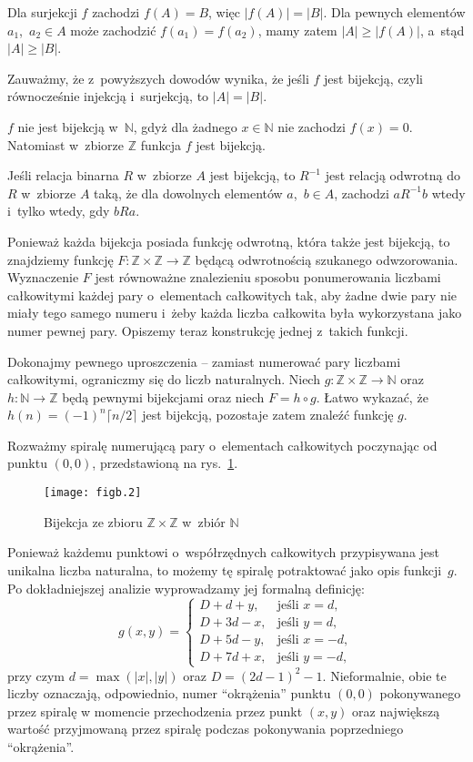\subexercise
Dla surjekcji $f$ zachodzi $f(A)=B$, więc $|f(A)|=|B|$. Dla pewnych elementów $a_1$,~$a_2\in A$ może zachodzić $f(a_1)=f(a_2)$, mamy zatem $|A|\ge|f(A)|$, a~stąd $|A|\ge|B|$.
\bigskip

Zauważmy, że z~powyższych dowodów wynika, że jeśli $f$ jest bijekcją, czyli równocześnie injekcją i~surjekcją, to $|A|=|B|$.

\exercise %
$f$ nie jest bijekcją w~$\mathbb{N}$, gdyż dla żadnego $x\in\mathbb{N}$ nie zachodzi $f(x)=0$. Natomiast w~zbiorze $\mathbb{Z}$ funkcja $f$ jest bijekcją.

\exercise %
Jeśli relacja binarna $R$ w~zbiorze $A$ jest bijekcją, to $R^{-1}$ jest relacją odwrotną do $R$ w~zbiorze $A$ taką, że dla dowolnych elementów $a$,~$b\in A$, zachodzi $aR^{-1}b$ wtedy i~tylko wtedy, gdy $bRa$.

\exercise %
Ponieważ każda bijekcja posiada funkcję odwrotną, która także jest bijekcją, to znajdziemy funkcję $F\colon\mathbb{Z}\times\mathbb{Z}\to\mathbb{Z}$ będącą odwrotnością szukanego odwzorowania. Wyznaczenie $F$ jest równoważne znalezieniu sposobu ponumerowania liczbami całkowitymi każdej pary o~elementach całkowitych tak, aby żadne dwie pary nie miały tego samego numeru i~żeby każda liczba całkowita była wykorzystana jako numer pewnej pary. Opiszemy teraz konstrukcję jednej z~takich funkcji.

Dokonajmy pewnego uproszczenia -- zamiast numerować pary liczbami całkowitymi, ograniczmy się do liczb naturalnych. Niech $g\colon\mathbb{Z}\times\mathbb{Z}\to\mathbb{N}$ oraz $h\colon\mathbb{N}\to\mathbb{Z}$ będą pewnymi bijekcjami oraz niech $F=h\circ g$. Łatwo wykazać, że $h(n)=(-1)^n\lceil n/2\rceil$ jest bijekcją, pozostaje zatem znaleźć funkcję $g$.

Rozważmy spiralę numerującą pary o~elementach całkowitych poczynając od punktu $(0,0)$, przedstawioną na rys.~\ref{fig:B.3-4}.
\begin{figure}[ht]
	\begin{center}
		\texttt{[image: figb.2]}
	\end{center}
	\caption{Bijekcja ze zbioru $\mathbb{Z}\times\mathbb{Z}$ w~zbiór $\mathbb{N}$} \label{fig:B.3-4}
\end{figure}
Ponieważ każdemu punktowi o~współrzędnych całkowitych przypisywana jest unikalna liczba naturalna, to możemy tę spiralę potraktować jako opis funkcji~$g$. Po dokładniejszej analizie wyprowadzamy jej formalną definicję:
\[
	g(x,y) =
	\begin{cases}
		D+d+y, & \text{jeśli $x=d$}, \\
		D+3d-x, & \text{jeśli $y=d$}, \\
		D+5d-y, & \text{jeśli $x=-d$}, \\
		D+7d+x, & \text{jeśli $y=-d$},
	\end{cases}
\]
przy czym $d=\max(|x|,|y|)$ oraz $D=(2d-1)^2-1$. Nieformalnie, obie te liczby oznaczają, odpowiednio, numer ``okrążenia'' punktu $(0,0)$ pokonywanego przez spiralę w momencie przechodzenia przez punkt $(x,y)$ oraz największą wartość przyjmowaną przez spiralę podczas pokonywania poprzedniego ``okrążenia''.

